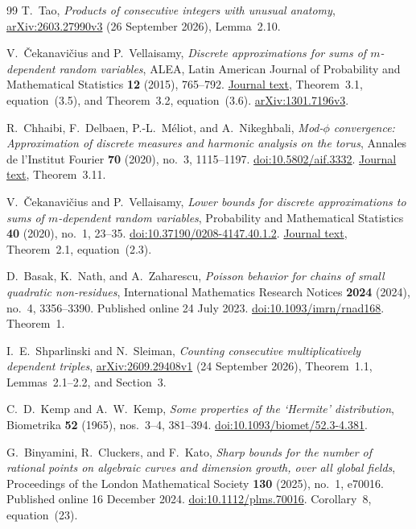 \begin{thebibliography}{99}
T.~Tao,
\emph{Products of consecutive integers with unusual anatomy},
\href{https://arxiv.org/abs/2603.27990v3}{arXiv:2603.27990v3}
(26 September 2026), Lemma~2.10.

V.~\v{C}ekanavi\v{c}ius and P.~Vellaisamy,
\emph{Discrete approximations for sums of $m$-dependent random variables},
ALEA, Latin American Journal of Probability and Mathematical Statistics
\textbf{12} (2015), 765--792.
\href{https://alea.impa.br/articles/v12/12-29.pdf}{Journal text},
Theorem~3.1, equation~(3.5), and Theorem~3.2, equation~(3.6).
\href{https://arxiv.org/abs/1301.7196v3}{arXiv:1301.7196v3}.

R.~Chhaibi, F.~Delbaen, P.-L.~M\'eliot, and A.~Nikeghbali,
\emph{Mod-$\phi$ convergence: Approximation of discrete measures
and harmonic analysis on the torus},
Annales de l'Institut Fourier \textbf{70} (2020),
no.~3, 1115--1197.
\href{https://doi.org/10.5802/aif.3332}{doi:10.5802/aif.3332}.
\href{https://numdam.org/item/10.5802/aif.3332.pdf}{Journal text},
Theorem~3.11.

V.~\v{C}ekanavi\v{c}ius and P.~Vellaisamy,
\emph{Lower bounds for discrete approximations to sums of
$m$-dependent random variables},
Probability and Mathematical Statistics \textbf{40} (2020),
no.~1, 23--35.
\href{https://doi.org/10.37190/0208-4147.40.1.2}
{doi:10.37190/0208-4147.40.1.2}.
\href{https://www.math.uni.wroc.pl/~pms/files_doi/f1648/f1648.pdf}
{Journal text}, Theorem~2.1, equation~(2.3).

D.~Basak, K.~Nath, and A.~Zaharescu,
\emph{Poisson behavior for chains of small quadratic non-residues},
International Mathematics Research Notices \textbf{2024} (2024),
no.~4, 3356--3390. Published online 24 July 2023.
\href{https://doi.org/10.1093/imrn/rnad168}
{doi:10.1093/imrn/rnad168}. Theorem~1.

I.~E.~Shparlinski and N.~Sleiman,
\emph{Counting consecutive multiplicatively dependent triples},
\href{https://arxiv.org/abs/2609.29408v1}
{arXiv:2609.29408v1} (24 September 2026),
Theorem~1.1, Lemmas~2.1--2.2, and Section~3.

C.~D.~Kemp and A.~W.~Kemp,
\emph{Some properties of the `Hermite' distribution},
Biometrika \textbf{52} (1965), nos.~3--4, 381--394.
\href{https://doi.org/10.1093/biomet/52.3-4.381}
{doi:10.1093/biomet/52.3-4.381}.

G.~Binyamini, R.~Cluckers, and F.~Kato,
\emph{Sharp bounds for the number of rational points on algebraic curves
and dimension growth, over all global fields},
Proceedings of the London Mathematical Society \textbf{130} (2025),
no.~1, e70016. Published online 16 December 2024.
\href{https://doi.org/10.1112/plms.70016}
{doi:10.1112/plms.70016}.
Corollary~8, equation~(23).


\end{thebibliography}
